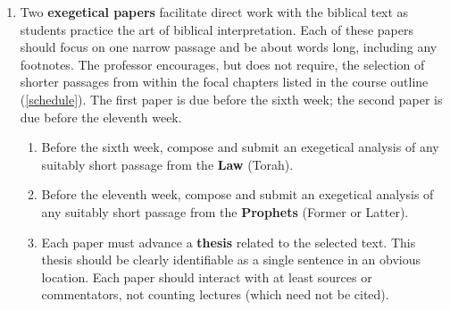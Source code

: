 \documentclass[titlepage]{article}
\begin{document}
\begin{enumerate}
\begin{enumerate}
	\end{enumerate}


	\item Two \textbf{exegetical papers} facilitate direct work with the
	biblical text as students practice the art of biblical
	interpretation. Each of these papers should focus on one narrow
	passage and be about  words long, including any
	footnotes. The professor encourages, but does not require, the
	selection of shorter passages from within the focal chapters listed
	in the course outline (\autoref{schedule}). The first paper is due
	before the sixth week; the second paper is due before the eleventh
	week.


	\begin{enumerate}

		\item Before the sixth week, compose and submit an exegetical
		analysis of any suitably short passage from the \textbf{Law}
		(Torah).

		\item Before the eleventh week, compose and submit an
		exegetical analysis of any suitably short passage from the
		\textbf{Prophets} (Former or Latter).

		\item Each paper must advance a \textbf{thesis} related to the
		selected text. This thesis should be clearly identifiable as a
		single sentence in an obvious location. Each paper should
		interact with at least  sources or
		commentators, not counting lectures (which need not be cited).


\end{enumerate}
\end{enumerate}
\end{document}

